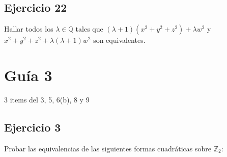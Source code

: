 \documentclass[12pt]{amsart}
\newcommand{\QQ}{\mathbb{Q}}
\newcommand{\ZZ}{\mathbb{Z}}
\newcommand{\lp}{\left(}
\newcommand{\rp}{\right)}
\theoremstyle{plain}
\begin{document}



\subsection*{Ejercicio 22}
Hallar todos los $\lambda \in \QQ$ tales que 
$\lp \lambda + 1 \rp \lp x^2+y^2+z^2 \rp + \lambda w^2$ y 
$x^2 + y^2 + z^2 + \lambda \lp \lambda + 1 \rp w^2$
son equivalentes.

\section*{Guía 3}

3 items del 3, 5, 6(b), 8 y 9

\subsection*{Ejercicio 3} Probar las equivalencias de las siguientes
formas cuadráticas sobre $\ZZ_2$:
\end{document}
